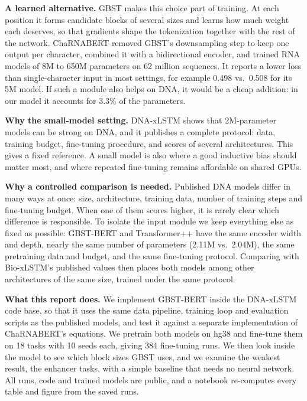 \documentclass{article}
\begin{document}
\textbf{A learned alternative.} GBST \citep{tay2022charformer} makes this choice part of training. At
each position it forms candidate blocks of several sizes and learns how much weight each deserves, so
that gradients shape the tokenization together with the rest of the network. ChaRNABERT
\citep{moralespastor2024charnabert} removed GBST's downsampling step to keep one output per
character, combined it with a bidirectional encoder, and trained RNA models of 8M to 650M parameters
on 62 million sequences. It reports a lower loss than single-character input in most settings, for
example 0.498 vs.\ 0.508 for its 5M model. If such a module also helps on DNA, it would be a cheap
addition: in our model it accounts for 3.3\% of the parameters.

\textbf{Why the small-model setting.} DNA-xLSTM \citep{schmidinger2024bioxlstm} shows that 2M-parameter
models can be strong on DNA, and it publishes a complete protocol: data, training budget, fine-tuning
procedure, and scores of several architectures. This gives a fixed reference. A small model is also
where a good inductive bias should matter most, and where repeated fine-tuning remains affordable on
shared GPUs.

\textbf{Why a controlled comparison is needed.} Published DNA models differ in many ways at once:
size, architecture, training data, number of training steps and fine-tuning budget. When one of them
scores higher, it is rarely clear which difference is responsible. To isolate the input module we
keep everything else as fixed as possible: GBST-BERT and Transformer++ have the same encoder width
and depth, nearly the same number of parameters (2.11M vs.\ 2.04M), the same pretraining data and
budget, and the same fine-tuning protocol. Comparing with Bio-xLSTM's published values then places
both models among other architectures of the same size, trained under the same protocol.

\textbf{What this report does.} We implement GBST-BERT inside the DNA-xLSTM code base, so that it
uses the same data pipeline, training loop and evaluation scripts as the published models, and test
it against a separate implementation of ChaRNABERT's equations. We pretrain both models on hg38 and
fine-tune them on 18 tasks with 10 seeds each, giving 384 fine-tuning runs. We then look inside the
model to see which block sizes GBST uses, and we examine the weakest result, the enhancer tasks, with
a simple baseline that needs no neural network. All runs, code and trained models are public, and a
notebook re-computes every table and figure from the saved runs.
\end{document}
